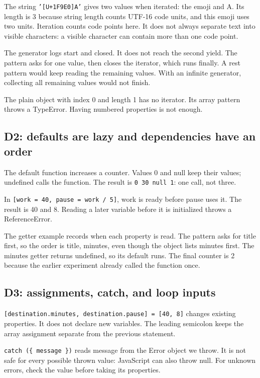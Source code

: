 \documentclass[
  10pt,
  a4paper,
]{article}
\begin{document}
The string \texttt{'[U+1F9E0]A'} gives two values when iterated: the
emoji and A. Its length is 3 because string length counts UTF-16 code
units, and this emoji uses two units. Iteration counts code points here.
It does not always separate text into visible characters: a visible
character can contain more than one code point.

The generator logs start and closed. It does not reach the second yield.
The pattern asks for one value, then closes the iterator, which runs
finally. A rest pattern would keep reading the remaining values. With an
infinite generator, collecting all remaining values would not finish.

The plain object with index 0 and length 1 has no iterator. Its array
pattern throws a TypeError. Having numbered properties is not enough.

\subsection{D2: defaults are lazy and dependencies have an
order}\label{d2-defaults-are-lazy-and-dependencies-have-an-order}

The default function increases a counter. Values 0 and null keep their
values; undefined calls the function. The result is
\texttt{0 30 null 1}: one call, not three.

In \texttt{[work = 40, pause = work /\allowbreak{} 5]}, work is ready
before pause uses it. The result is 40 and 8. Reading a later variable
before it is initialized throws a ReferenceError.

The getter example records when each property is read. The pattern asks
for title first, so the order is title, minutes, even though the object
lists minutes first. The minutes getter returns undefined, so its
default runs. The final counter is 2 because the earlier experiment
already called the function once.

\subsection{D3: assignments, catch, and loop
inputs}\label{d3-assignments-catch-and-loop-inputs}

\texttt{[destination.\allowbreak{}minutes, destination.\allowbreak{}pause] = [40, 8]}
changes existing properties. It does not declare new variables. The
leading semicolon keeps the array assignment separate from the previous
statement.

\texttt{catch (\{ message \})} reads message from the Error object we
throw. It is not safe for every possible thrown value: JavaScript can
also throw null. For unknown errors, check the value before taking its
properties.
\end{document}
